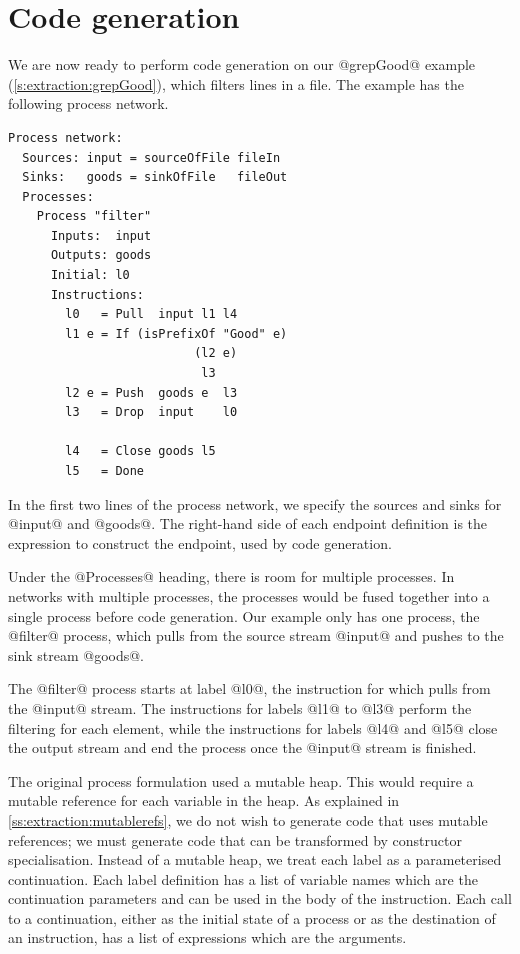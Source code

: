 \section{Code generation}
We are now ready to perform code generation on our @grepGood@ example (\autoref{s:extraction:grepGood}), which filters lines in a file.
The example has the following process network.

\begin{lstlisting}
Process network:
  Sources: input = sourceOfFile fileIn
  Sinks:   goods = sinkOfFile   fileOut
  Processes:
    Process "filter"
      Inputs:  input
      Outputs: goods
      Initial: l0
      Instructions:
        l0   = Pull  input l1 l4
        l1 e = If (isPrefixOf "Good" e)
                          (l2 e)
                           l3
        l2 e = Push  goods e  l3
        l3   = Drop  input    l0

        l4   = Close goods l5
        l5   = Done
\end{lstlisting}

In the first two lines of the process network, we specify the sources and sinks for @input@ and @goods@.
The right-hand side of each endpoint definition is the expression to construct the endpoint, used by code generation.

Under the @Processes@ heading, there is room for multiple processes.
In networks with multiple processes, the processes would be fused together into a single process before code generation.
Our example only has one process, the @filter@ process, which pulls from the source stream @input@ and pushes to the sink stream @goods@.

The @filter@ process starts at label @l0@, the instruction for which pulls from the @input@ stream.
The instructions for labels @l1@ to @l3@ perform the filtering for each element, while the instructions for labels @l4@ and @l5@ close the output stream and end the process once the @input@ stream is finished.

The original process formulation  used a mutable heap.
This would require a mutable reference for each variable in the heap.
As explained in \autoref{ss:extraction:mutablerefs}, we do not wish to generate code that uses mutable references; we must generate code that can be transformed by constructor specialisation.
Instead of a mutable heap, we treat each label as a parameterised continuation.
Each label definition has a list of variable names which are the continuation parameters and can be used in the body of the instruction.
Each call to a continuation, either as the initial state of a process or as the destination of an instruction, has a list of expressions which are the arguments.

